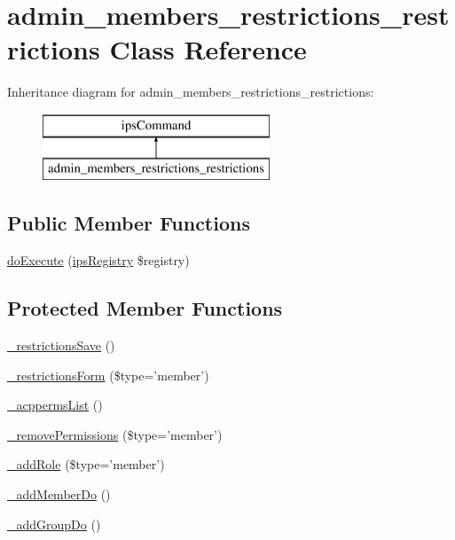 \hypertarget{classadmin__members__restrictions__restrictions}{\section{admin\-\_\-members\-\_\-restrictions\-\_\-restrictions Class Reference}
\label{classadmin__members__restrictions__restrictions}
}
Inheritance diagram for admin\-\_\-members\-\_\-restrictions\-\_\-restrictions\-:\begin{figure}[H]
\begin{center}
\leavevmode
\includegraphics[height=2.000000cm]{classadmin__members__restrictions__restrictions}
\end{center}
\end{figure}
\subsection*{Public Member Functions}
\begin{DoxyCompactItemize}
\item 
\hyperlink{classadmin__members__restrictions__restrictions_afbc4e912a0604b94d47d66744c64d8ba}{do\-Execute} (\hyperlink{classips_registry}{ips\-Registry} \$registry)
\end{DoxyCompactItemize}
\subsection*{Protected Member Functions}
\begin{DoxyCompactItemize}
\item 
\hyperlink{classadmin__members__restrictions__restrictions_a638e963aca58b9a98c6d134de93152cf}{\-\_\-restrictions\-Save} ()
\item 
\hyperlink{classadmin__members__restrictions__restrictions_afe0e982917dfb40ef71fc29828b08e34}{\-\_\-restrictions\-Form} (\$type='member')
\item 
\hyperlink{classadmin__members__restrictions__restrictions_adc246fd2c65fb4c54ff5e4cc44241501}{\-\_\-acpperms\-List} ()
\item 
\hyperlink{classadmin__members__restrictions__restrictions_a3f9e2e0639058d4c66e28a2c1bc34e64}{\-\_\-remove\-Permissions} (\$type='member')
\item 
\hyperlink{classadmin__members__restrictions__restrictions_a415f94cb5a00572a265694c544cb9213}{\-\_\-add\-Role} (\$type='member')
\item 
\hyperlink{classadmin__members__restrictions__restrictions_a0d5212b426b08cbad30ae680e741fe2e}{\-\_\-add\-Member\-Do} ()
\item 
\hyperlink{classadmin__members__restrictions__restrictions_a8c944fd214452ae58ca979e13eaa7ffb}{\-\_\-add\-Group\-Do} ()
\end{DoxyCompactItemize}
